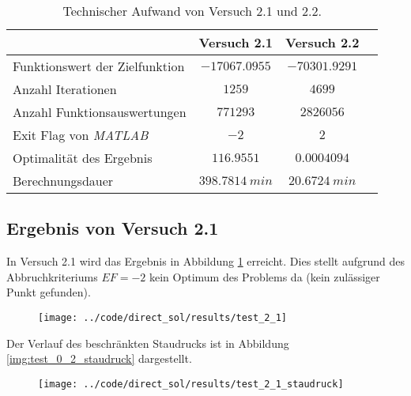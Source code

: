 \begin{table}[H]
    \centering
    \caption{Technischer Aufwand von Versuch 2.1 und 2.2.}\label{tab:Versuch2_TA}
    \begin{tabularx}{.9\textwidth}{Zccc}
        \toprule
         & \textbf{Versuch 2.1} & \textbf{Versuch 2.2} \\
        \midrule
        Funktionswert der Zielfunktion & $-17067.0955$ & $-70301.9291$ \\
        Anzahl Iterationen & $1259$ & $4699$ \\
        Anzahl Funktionsauswertungen & $771293$ & $2826056$ \\
        Exit Flag von \textit{MATLAB} & $-2$ & $2$ \\
        Optimalität des Ergebnis & $116.9551$ & $0.0004094$ \\
        Berechnungsdauer & $398.7814 \ min$ & $20.6724 \ min$ \\
        \bottomrule
    \end{tabularx}
\end{table}




\subsection{Ergebnis von Versuch 2.1}\label{kap:Versuch21}
In Versuch 2.1 wird das Ergebnis in Abbildung \ref{img:test_2_1} erreicht. Dies stellt aufgrund des Abbruchkriteriums $EF = -2$ kein Optimum des Problems da (kein zulässiger Punkt gefunden).
\begin{figure}[H]
\begin{center}
\texttt{[image: ../code/direct\_sol/results/test\_2\_1]}
 \label{img:test_2_1}
\end{center}
\end{figure}
Der Verlauf des beschränkten Staudrucks ist in Abbildung \ref{img:test_0_2_staudruck} dargestellt.
\begin{figure}[H]
\begin{center}
\texttt{[image: ../code/direct\_sol/results/test\_2\_1\_staudruck]}
 \label{img:test_2_1_staudruck}
\end{center}
\end{figure}




